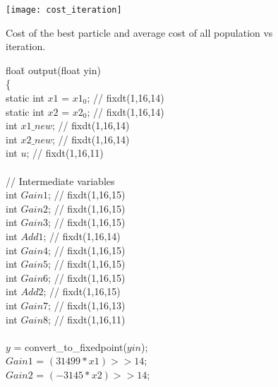 \documentclass{amsart}
\numberwithin{equation}{section}
\begin{document}
\begin{figure}
\begin{center}
\texttt{[image: cost\_iteration]}
\end{center}
\caption{Cost of the best particle and average cost of all population vs iteration.}
\label{fig2}
\end{figure}

\begin{figure}
\centering
\begin{tt}
\begin{scriptsize}
\parbox{0cm}{
\begin{tabbing}
floa\=t output(float yin)\ \ \=\\
\{\\
\>    static int $x1$ = $x1_0$;\>	// fixdt(1,16,14) \\
\>    static int $x2$ = $x2_0$;\>	// fixdt(1,16,14) \\
\>    int $x1\_new$;	\> 			// fixdt(1,16,14) \\
\>    int $x2\_new$;	\>			// fixdt(1,16,14) \\
\>    int $u$;		\>        		// fixdt(1,16,11) \\
\\    
\>    // Intermediate variables \\
\>    int $Gain1$;              \>		// fixdt(1,16,15) \\
\>    int $Gain2$;              \>		// fixdt(1,16,15) \\
\>    int $Gain3$;              \>		// fixdt(1,16,15) \\
\>    int $Add1$;               \>		// fixdt(1,16,14) \\
\>    int $Gain4$;              \>		// fixdt(1,16,15) \\
\>    int $Gain5$;              \>		// fixdt(1,16,15) \\
\>    int $Gain6$;              \>		// fixdt(1,16,15) \\
\>    int $Add2$;               \>		// fixdt(1,16,15) \\
\>    int $Gain7$;              \>		// fixdt(1,16,13) \\
\>    int $Gain8$;              \>		// fixdt(1,16,11) \\
\\    
\>    $y$ = convert\_to\_fixedpoint($yin$);  \\
\>    $Gain1$ = $(31499 * x1) >> 14$; \\
\>    $Gain2$ = $(-3145 * x2) >> 14$; \\

\end{tabbing}}
\end{scriptsize}
\end{tt}
\end{figure}
\end{document}
